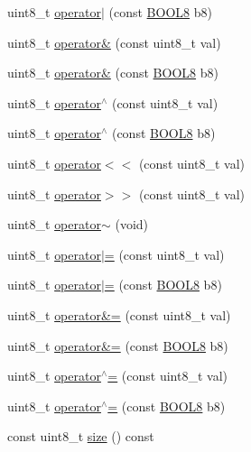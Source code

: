 \begin{DoxyCompactItemize}
uint8\+\_\+t \hyperlink{struct_b_o_o_l8_a7bbcc21bbabb6e8fe93b6e934c3c7181}{operator$\vert$} (const \hyperlink{struct_b_o_o_l8}{B\+O\+O\+L8} b8)
\item 
uint8\+\_\+t \hyperlink{struct_b_o_o_l8_a5e3a6bbe953bf6398e6ca4c6187091a6}{operator\&} (const uint8\+\_\+t val)
\item 
uint8\+\_\+t \hyperlink{struct_b_o_o_l8_a21d931374d9d1261914840eb3d048ba5}{operator\&} (const \hyperlink{struct_b_o_o_l8}{B\+O\+O\+L8} b8)
\item 
uint8\+\_\+t \hyperlink{struct_b_o_o_l8_adae599000cecc5416839392676510e6d}{operator$^\wedge$} (const uint8\+\_\+t val)
\item 
uint8\+\_\+t \hyperlink{struct_b_o_o_l8_a5ccf74d3b597ef781245587f1cd80371}{operator$^\wedge$} (const \hyperlink{struct_b_o_o_l8}{B\+O\+O\+L8} b8)
\item 
uint8\+\_\+t \hyperlink{struct_b_o_o_l8_aabd1a1ca848cb396417deeaa7a3007f1}{operator$<$$<$} (const uint8\+\_\+t val)
\item 
uint8\+\_\+t \hyperlink{struct_b_o_o_l8_a85faf9252049c6e5ff85656eb8120a9b}{operator$>$$>$} (const uint8\+\_\+t val)
\item 
uint8\+\_\+t \hyperlink{struct_b_o_o_l8_a3966ebe4c2b0950a237dcf0417f8989a}{operator$\sim$} (void)
\item 
uint8\+\_\+t \hyperlink{struct_b_o_o_l8_a1972e81b43a040e9f7cbb97101ec88d6}{operator$\vert$=} (const uint8\+\_\+t val)
\item 
uint8\+\_\+t \hyperlink{struct_b_o_o_l8_a514b5a432090721b3799d6abe87f6282}{operator$\vert$=} (const \hyperlink{struct_b_o_o_l8}{B\+O\+O\+L8} b8)
\item 
uint8\+\_\+t \hyperlink{struct_b_o_o_l8_a55559ec3a2040be9d93af7215181520e}{operator\&=} (const uint8\+\_\+t val)
\item 
uint8\+\_\+t \hyperlink{struct_b_o_o_l8_ae47dbba9a70f023230fdee19c62b2390}{operator\&=} (const \hyperlink{struct_b_o_o_l8}{B\+O\+O\+L8} b8)
\item 
uint8\+\_\+t \hyperlink{struct_b_o_o_l8_ad39e2e7a7089ead2fa8607658548f191}{operator$^\wedge$=} (const uint8\+\_\+t val)
\item 
uint8\+\_\+t \hyperlink{struct_b_o_o_l8_a673c35786949a1f5c208caff8d3eefb0}{operator$^\wedge$=} (const \hyperlink{struct_b_o_o_l8}{B\+O\+O\+L8} b8)
\item 
const uint8\+\_\+t \hyperlink{struct_b_o_o_l8_a82bfc35d98b03e50e63d0f1ec2458d1c}{size} () const
\end{DoxyCompactItemize}

